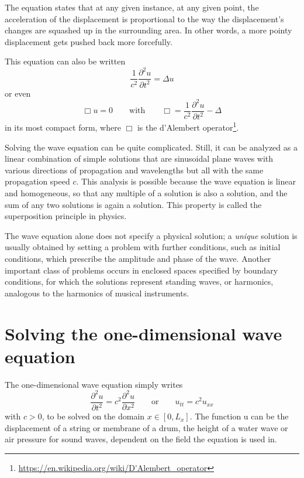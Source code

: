 The equation states that at any given instance, at any given point, 
the acceleration of the displacement is proportional to the way the displacement's 
changes are squashed up in the surrounding area. In other words, a more pointy 
displacement gets pushed back more forcefully. 

This equation can also be written 
\begin{equation}
\frac{1}{c^2} \frac{\partial^2 u}{\partial t^2} = \Delta u
\end{equation}
or even 
\[
\Box u = 0 \qquad \text{with} \qquad \Box= \frac{1}{c^2} \frac{\partial^2 u}{\partial t^2} - \Delta
\]
in its most compact form, where $\Box$ is the d'Alembert 
operator\footnote{\url{https://en.wikipedia.org/wiki/D'Alembert_operator}}.


Solving the wave equation can be quite complicated. Still, it can be analyzed 
as a linear combination of simple solutions that are sinusoidal plane waves 
with various directions of propagation and wavelengths but all with the same propagation 
speed $c$. This analysis is possible because the wave equation is linear and homogeneous, 
so that any multiple of a solution is also a solution, and the sum of any two solutions 
is again a solution. This property is called the superposition principle in physics.


The wave equation alone does not specify a physical solution; 
a {\it unique} solution is usually obtained by setting a problem with further 
conditions, such as initial conditions, which prescribe the amplitude and phase of the wave. 
Another important class of problems occurs in enclosed spaces specified by boundary 
conditions, for which the solutions represent standing waves, or harmonics, analogous 
to the harmonics of musical instruments. 



\section{Solving the one-dimensional wave equation}

The one-dimensional wave equation simply writes
\[
\frac{\partial^2 u}{\partial t^2} = c^2 
\frac{\partial^2 u}{\partial x^2} 
\qquad \text{or}
\qquad 
u_{tt} = c^2 u_{xx}
\]
with $c>0$, to be solved on the domain $x \in [0,L_x]$.
The function u can be the displacement of a string or membrane of a drum, the height of a water wave or
air pressure for sound waves, dependent on the field the equation is used in.

